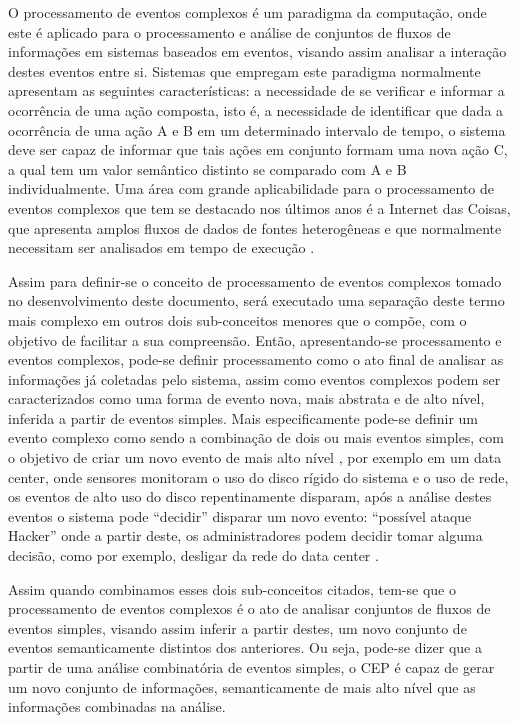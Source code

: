 \documentclass[ti,table]{texufpel} %
\begin{document}
O processamento de eventos complexos é um paradigma da computação, onde este é aplicado para o processamento e análise de conjuntos de fluxos de informações em sistemas baseados em eventos, visando assim analisar a interação destes eventos entre si. Sistemas que empregam este paradigma normalmente apresentam as seguintes características: a necessidade de se verificar e informar a ocorrência de uma ação composta, isto é, a necessidade de identificar que dada a ocorrência de uma ação A e B em um determinado intervalo de tempo, o sistema deve ser capaz de informar que tais ações em conjunto formam uma nova ação C, a qual tem um valor semântico distinto se comparado com A e B individualmente. Uma área com grande aplicabilidade para o processamento de eventos complexos que tem se destacado nos últimos anos é a Internet das Coisas, que apresenta amplos fluxos de dados de fontes heterogêneas e que normalmente necessitam ser analisados em tempo de execução \cite{jun2014design}.  

  

Assim para definir-se o conceito de processamento de eventos complexos tomado no desenvolvimento deste documento, será executado uma separação deste termo mais complexo em outros dois sub-conceitos menores que o compõe, com o objetivo de facilitar a sua compreensão. Então, apresentando-se processamento e eventos complexos, pode-se definir processamento como o ato final de analisar as informações já coletadas pelo sistema, assim como eventos complexos podem ser caracterizados como uma forma de evento nova, mais abstrata e de alto nível, inferida a partir de eventos simples. Mais especificamente pode-se definir um evento complexo como sendo a combinação de dois ou mais eventos simples, com o objetivo de criar um novo evento de mais alto nível \cite{dayarathna2018recent}, por exemplo em um data center, onde sensores monitoram o uso do disco rígido do sistema e o uso de rede, os eventos de alto uso do disco repentinamente disparam, após a análise destes eventos o sistema pode ``decidir'' disparar um novo evento: ``possível ataque Hacker'' onde a partir deste, os administradores podem decidir tomar alguma decisão, como por exemplo, desligar da rede do data center \cite{wu2006high}.  

  

Assim quando combinamos esses dois sub-conceitos citados, tem-se que o processamento de eventos complexos é o ato de analisar conjuntos de fluxos de eventos simples, visando assim inferir a partir destes, um novo conjunto de eventos semanticamente distintos dos anteriores. Ou seja, pode-se dizer que a partir de uma análise combinatória de eventos simples, o CEP é capaz de gerar um novo conjunto de informações, semanticamente de mais alto nível que as informações combinadas na análise. 
\end{document}
